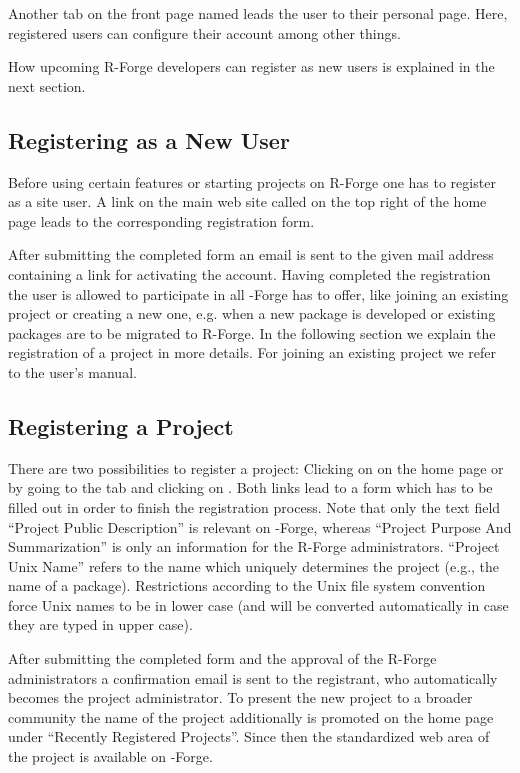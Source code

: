 Another tab on the front page named  leads the user to
their personal page. Here, registered users can configure their
account among other things.

How upcoming R-Forge developers can register as new users is
explained in the next section.

\subsection{Registering as a New User}

Before using certain features or starting projects on R-Forge one has
to register as a site user. A link on the main web site called
 on the top right of the home page leads to the
corresponding registration form.

After submitting the completed form an email is sent to the given mail
address containing a link for activating the account. Having completed
the registration the user is allowed to participate in all \R{}-Forge
has to offer, like joining an existing project or creating a new one,
e.g. when a new package is developed or existing packages are to be
migrated to R-Forge. In the following section we explain 
the registration of a project in more details. For joining an existing
project we refer to the user's manual.

\subsection{Registering a Project}

There are two possibilities to register a project: Clicking on
 on the home page or by going to the  tab and clicking on . Both links lead to a
form which has to be filled out in order to finish the registration
process. Note that only the text field ``Project Public Description''
is relevant on \R{}-Forge, whereas ``Project Purpose And
Summarization'' is only an information for the R-Forge
administrators. ``Project Unix Name'' refers to the name which
uniquely determines the project (e.g., the name of a
package). Restrictions according to the Unix file system convention 
force Unix names to be in lower case (and will
be converted automatically in case they are typed in upper
case).

After submitting the completed form and the approval of the R-Forge
administrators a confirmation email is sent to the registrant, who
automatically becomes the project administrator. To present the new
project to a broader community the name of the project additionally is
promoted on the home page under ``Recently Registered
Projects''. Since then the standardized web area of the project is
available on \R{}-Forge. 


